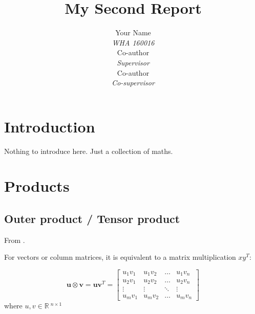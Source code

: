 \documentclass{article}
\title{My Second Report}
\author{Your Name \\ \textit{WHA 160016} \\ \AND
        Co-author \\ \textit{Supervisor} \\ \AND
        Co-author \\ \textit{Co-supervisor}}
\begin{document}
\maketitle

\tableofcontents
\listoffigures
\listoftables
\clearpage



\section{Introduction}
\label{sec: Introduction}

Nothing to introduce here. Just a collection of maths.





\section{Products}
\label{sec: Products}


\subsection[Outer product]{Outer product / Tensor product}
\label{subsec: Outer product}

From \cite{wiki2019outerProd}.

For vectors or column matrices, it is equivalent to a matrix multiplication $x y^{T}$:

\begin{equation}
    \mathbf{u} \otimes \mathbf{v} = \mathbf{u} \mathbf{v}^{T} = \left[ \begin{array}{cccc}{u_{1} v_{1}} & {u_{1} v_{2}} & {\ldots} & {u_{1} v_{n}} \\ {u_{2} v_{1}} & {u_{2} v_{2}} & {\dots} & {u_{2} v_{n}} \\ {\vdots} & {\vdots} & {\ddots} & {\vdots} \\ {u_{m} v_{1}} & {u_{m} v_{2}} & {\ldots} & {u_{m} v_{n}}\end{array}\right]
\end{equation}
\noindent
where $u, v \in\mathbb{R}\:^{n \times 1}$
\end{document}
